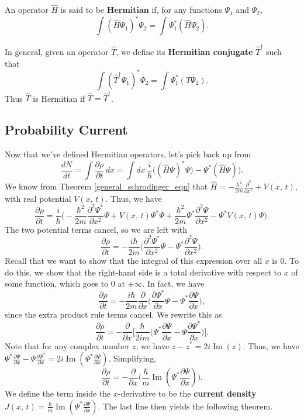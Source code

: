 \begin{frameddefn}\label{hermitian}
   An operator $\hat{H}$ is said to be \textbf{Hermitian} if, for any functions $\Psi_1$ and $\Psi_2$, $$\int(\hat{H}\Psi_1)^*\Psi_2=\int\Psi_1^*(\hat{H}\Psi_2).$$ 
\end{frameddefn}

In general, given an operator $\hat{T}$, we define its \textbf{Hermitian conjugate} $\hat{T}^\dagger$ such that $$\int(\hat{T}^\dagger\Psi_1)^*\Psi_2=\int\Psi_1^*(T\Psi_2).$$Thus $\hat{T}$ is Hermitian if $\hat{T}=\hat{T}^\dagger$.

\subsection{Probability Current}\label{prob_current}

Now that we've defined Hermitian operators, let's pick back up from $$\frac{dN}{dt}=\int\frac{\partial\rho}{\partial t}\,dx=\int dx\,\frac{i}{\hbar}\bigg((\hat{H}\Psi)^*\Psi)-\Psi^*(\hat{H}\Psi)\bigg).$$We know from Theorem \ref{general_schrodinger_eqn} that $\hat{H}=-\frac{\hbar^2}{2m}\frac{\partial^2}{\partial x^2}+V(x,\,t)$, with real potential $V(x,\,t)$. Thus, we have $$\frac{\partial\rho}{\partial t}=\frac{i}{\hbar}\bigg(-\frac{\hbar^2}{2m}\frac{\partial^2\Psi^*}{\partial x^2}\Psi+V(x,\,t)\Psi^*\Psi+\frac{\hbar^2}{2m}\Psi^*\frac{\partial^2\Psi}{\partial x^2}-\Psi^*V(x,\,t)\Psi\bigg).$$The two potential terms cancel, so we are left with $$\frac{\partial\rho}{\partial t}=-\frac{i\hbar}{2m}\bigg(\frac{\partial^2\Psi^*}{\partial x^2}\Psi-\Psi^*\frac{\partial^2\Psi}{\partial x^2}\bigg).$$Recall that we want to show that the integral of this expression over all $x$ is $0$. To do this, we show that the right-hand side is a total derivative with respect to $x$ of some function, which goes to $0$ at $\pm\infty$. In fact, we have $$\frac{\partial\rho}{\partial t}=-\frac{i\hbar}{2m}\frac{\partial}{\partial x}\bigg(\frac{\partial\Psi^*}{\partial x}\Psi-\Psi^*\frac{\partial\Psi}{\partial x}\bigg),$$ since the extra product rule terms cancel. We rewrite this as $$\frac{\partial\rho}{\partial t}=-\frac{\partial}{\partial x}\bigg[\frac{\hbar}{2im}\bigg(\Psi^*\frac{\partial\Psi}{\partial x}-\Psi\frac{\partial\Psi^*}{\partial x}\bigg)\bigg].$$Note that for any complex number $z$, we have $z-z^*=2i\operatorname{Im}(z)$. Thus, we have $\Psi^*\frac{\partial\Psi}{\partial x}-\Psi\frac{\partial\Psi^*}{\partial x}=2i\operatorname{Im}(\Psi^*\frac{\partial\Psi}{\partial x})$. Simplifying, $$\frac{\partial\rho}{\partial t}=-\frac{\partial}{\partial x}\bigg(\frac{\hbar}{m}\operatorname{Im}(\Psi^*\frac{\partial\Psi}{\partial x})\bigg).$$We define the term inside the $x$-derivative to be the \textbf{current density} $J(x,\,t)=\frac{\hbar}{m}\operatorname{Im}(\Psi^*\frac{\partial\Psi}{\partial x})$. The last line then yields the following theorem.

